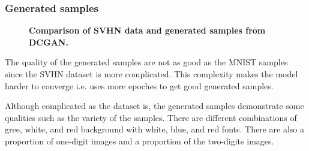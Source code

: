 \documentclass{article}
\newcommand{\mycaption}[2]{\caption[#1]{\textbf{#1.} #2}}
\begin{document}
\subsubsection{Generated samples}

\begin{figure}[!htb]
  \centering
  \mycaption{Comparison of SVHN data and generated samples from DCGAN}{}
  \label{fig_DCGAN_SVHN}
\end{figure}

The quality of the generated samples are not as good as the MNIST samples since the SVHN dataset is more complicated.
This complexity makes the model harder to converge i.e. uses more epoches to get good generated samples.

Although complicated as the dataset is, the generated samples demonstrate some qualities such as the variety of the samples. There are different combinations of gree, white, and red background with white, blue, and red fonts.
There are also a proportion of one-digit images and a proportion of the two-digits images.
\end{document}
